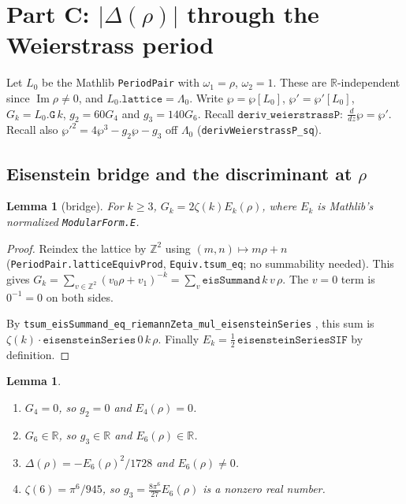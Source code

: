 \documentclass[11pt]{article}
\newtheorem{lemma}[theorem]{Lemma}
\theoremstyle{definition}
\theoremstyle{remark}
\newcommand{\R}{\mathbb R}
\newcommand{\Z}{\mathbb Z}
\newcommand{\LamO}{\Lambda_0}
\newcommand{\lean}[1]{\texttt{#1}}
\DeclareMathOperator{\Imag}{Im}
\begin{document}
\section{Part C: $|\Delta(\rho)|$ through the Weierstrass period}

Let $L_0$ be the Mathlib \lean{PeriodPair} with $\omega_1=\rho$, $\omega_2=1$. These are $\R$-independent since
$\Imag\rho\ne0$, and $L_0.\lean{lattice}=\LamO$. Write $\wp=\wp[L_0]$, $\wp'=\wp'[L_0]$, $G_k=L_0.\lean{G}\,k$,
$g_2=60G_4$ and $g_3=140G_6$. Recall $\lean{deriv\_weierstrassP}:\ \frac{d}{dz}\wp=\wp'$. Recall also
$\wp'^2=4\wp^3-g_2\wp-g_3$ off $\LamO$ (\lean{derivWeierstrassP\_sq}).

\subsection{Eisenstein bridge and the discriminant at $\rho$}

\begin{lemma}[bridge]\label{lem:C1}
For $k\ge3$, $G_k=2\zeta(k)E_k(\rho)$, where $E_k$ is Mathlib's normalized \lean{ModularForm.E}.
\end{lemma}

\begin{proof}
Reindex the lattice by $\Z^2$ using $(m,n)\mapsto m\rho+n$
(\lean{PeriodPair.latticeEquivProd}, \lean{Equiv.tsum\_eq}; no summability needed). This gives
$G_k=\sum_{v\in\Z^2}(v_0\rho+v_1)^{-k}=\sum_v\lean{eisSummand}\,k\,v\,\rho$. The $v=0$ term is $0^{-1}=0$ on
both sides.

By \lean{tsum\_eisSummand\_eq\_riemannZeta\_mul\_eisensteinSeries} ,
this sum is $\zeta(k)\cdot\lean{eisensteinSeries}\,0\,k\,\rho$. Finally
$E_k=\tfrac12\,\lean{eisensteinSeriesSIF}$ by definition.
\end{proof}

\begin{lemma}\label{lem:C2}
\begin{enumerate}
\item[(a)] $G_4=0$, so $g_2=0$ and $E_4(\rho)=0$.
\item[(b)] $G_6\in\R$, so $g_3\in\R$ and $E_6(\rho)\in\R$.
\item[(c)] $\Delta(\rho)=-E_6(\rho)^2/1728$ and $E_6(\rho)\ne0$.
\item[(d)] $\zeta(6)=\pi^6/945$, so $g_3=\frac{8\pi^6}{27}E_6(\rho)$ is a nonzero real number.
\end{enumerate}
\end{lemma}
\end{document}
